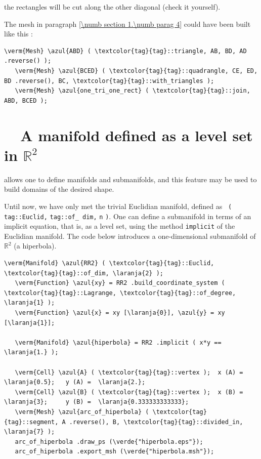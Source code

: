 \noindent the rectangles will be cut along the other diagonal (check it yourself).

The mesh in paragraph \ref{\numb section 1.\numb parag 4} could have been built like this :

\begin{Verbatim}[commandchars=\\\{\},formatcom=\small\tt,baselinestretch=0.94]
   \verm{Mesh} \azul{ABD} ( \textcolor{tag}{tag}::triangle, AB, BD, AD .reverse() );
   \verm{Mesh} \azul{BCED} ( \textcolor{tag}{tag}::quadrangle, CE, ED, BD .reverse(), BC, \textcolor{tag}{tag}::with_triangles );
   \verm{Mesh} \azul{one_tri_one_rect} ( \textcolor{tag}{tag}::join, ABD, BCED );
\end{Verbatim}


\section{~~A manifold defined as a level set in $ \mathbb{R}^2 $}
\label{\numb section 2.\numb parag 4}

{\ManiFEM} allows one to define manifolds and submanifolds, and this feature may be
used to build domains of the desired shape.

Until now, we have only met the trivial Euclidian manifold, defined as {\small\tt
{}\break ( \textcolor{tag}{tag}::Euclid,} {\small\tt \textcolor{tag}{tag}::of\_\,dim,} {\small\tt n}
{\small\tt )}.
One can define a submanifold in terms of an implicit equation, that is, as a level set,
using the method {\small\tt implicit} of the Euclidian manifold.
The code below introduces a one-dimensional submanifold of $ \mathbb{R}^2 $ (a hiperbola).

\begin{Verbatim}[commandchars=\\\{\},formatcom=\small\tt,frame=single,
   label=parag-\ref{\numb section 2.\numb parag 4}.cpp,rulecolor=\color{coment},
   baselinestretch=0.94,framesep=2mm]
   \verm{Manifold} \azul{RR2} ( \textcolor{tag}{tag}::Euclid, \textcolor{tag}{tag}::of_dim, \laranja{2} );
   \verm{Function} \azul{xy} = RR2 .build_coordinate_system ( \textcolor{tag}{tag}::Lagrange, \textcolor{tag}{tag}::of_degree, \laranja{1} );
   \verm{Function} \azul{x} = xy [\laranja{0}], \azul{y} = xy [\laranja{1}];
   
   \verm{Manifold} \azul{hiperbola} = RR2 .implicit ( x*y == \laranja{1.} );
   
   \verm{Cell} \azul{A} ( \textcolor{tag}{tag}::vertex );  x (A) =  \laranja{0.5};   y (A) =  \laranja{2.};
   \verm{Cell} \azul{B} ( \textcolor{tag}{tag}::vertex );  x (B) =  \laranja{3};     y (B) =  \laranja{0.333333333333};
   \verm{Mesh} \azul{arc_of_hiperbola} ( \textcolor{tag}{tag}::segment, A .reverse(), B, \textcolor{tag}{tag}::divided_in, \laranja{7} );
   arc_of_hiperbola .draw_ps (\verde{"hiperbola.eps"});
   arc_of_hiperbola .export_msh (\verde{"hiperbola.msh"});
\end{Verbatim}

